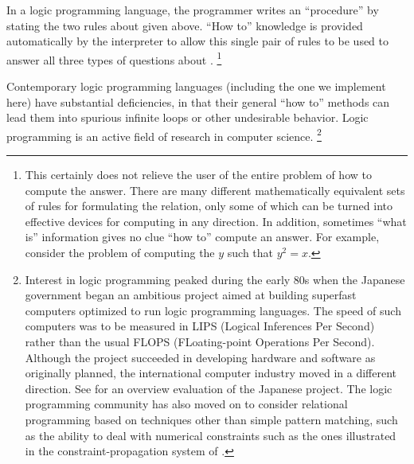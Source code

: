 In a logic programming language, the programmer writes an  “procedure” by stating the two rules about  given above.
“How to” knowledge is provided automatically by the interpreter to allow this single pair of rules to be used to answer all three types of questions about .%
\footnote{
	This certainly does not relieve the user of the entire problem of how to compute the answer.
	There are many different mathematically equivalent sets of rules for formulating the  relation, only some of which can be turned into effective devices for computing in any direction.
	In addition, sometimes “what is”  information gives no clue  “how to” compute an answer.
	For example, consider the problem of computing the \( y \) such that \( y^2 = x \).
}

Contemporary logic programming languages (including the one we implement here) have substantial deficiencies, in that their general “how to” methods can lead them into spurious infinite loops or other undesirable behavior.
Logic programming is an active field of research in computer science.%
\footnote{
	Interest in logic programming peaked during the early 80s when the Japanese government began an ambitious project aimed at building superfast computers optimized to run logic programming languages.
	The speed of such computers was to be measured in LIPS (Logical Inferences Per Second) rather than the usual FLOPS (FLoating-point Operations Per Second).
	Although the project succeeded in developing hardware and software as originally planned, the international computer industry moved in a different direction.
	See  for an overview evaluation of the Japanese project.
	The logic programming community has also moved on to consider relational programming based on techniques other than simple pattern matching, such as the ability to deal with numerical constraints such as the ones illustrated in the constraint-propagation system of .
}

